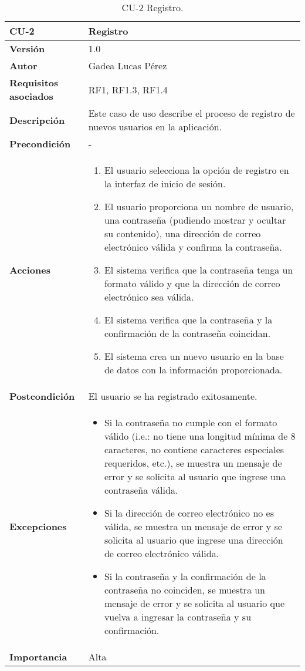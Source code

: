 \begin{table}[p]
\centering
\begin{tabularx}{\linewidth}{ p{} p{} }
\toprule
\textbf{CU-2} & \textbf{Registro}\\
\toprule
\textbf{Versión} & 1.0 \\
\textbf{Autor} & Gadea Lucas Pérez \\
\textbf{Requisitos asociados} & RF1, RF1.3, RF1.4  \\
\textbf{Descripción} & Este caso de uso describe el proceso de registro de nuevos usuarios en la aplicación.\\
\textbf{Precondición} & - \\
\textbf{Acciones} &
\begin{enumerate}
\def\labelenumi{\arabic{enumi}.}
\tightlist
\item El usuario selecciona la opción de registro en la interfaz de inicio de sesión.
\item El usuario proporciona un nombre de usuario, una contraseña (pudiendo mostrar y ocultar su contenido), una dirección de correo electrónico válida y confirma la contraseña.
\item El sistema verifica que la contraseña tenga un formato válido y que la dirección de correo electrónico sea válida.
\item El sistema verifica que la contraseña y la confirmación de la contraseña coincidan.
\item El sistema crea un nuevo usuario en la base de datos con la información proporcionada.
\end{enumerate}\\
\textbf{Postcondición} & El usuario se ha registrado exitosamente.\\
\textbf{Excepciones} &
\begin{itemize}
\item Si la contraseña no cumple con el formato válido (i.e.: no tiene una longitud mínima de 8 caracteres, no contiene caracteres especiales requeridos, etc.), se muestra un mensaje de error y se solicita al usuario que ingrese una contraseña válida.
\item Si la dirección de correo electrónico no es válida, se muestra un mensaje de error y se solicita al usuario que ingrese una dirección de correo electrónico válida.
\item Si la contraseña y la confirmación de la contraseña no coinciden, se muestra un mensaje de error y se solicita al usuario que vuelva a ingresar la contraseña y su confirmación.
\end{itemize}\\
\textbf{Importancia} & Alta\\
\bottomrule
\end{tabularx}
\caption{CU-2 Registro.}
\label{tab:cu2}
\end{table}


